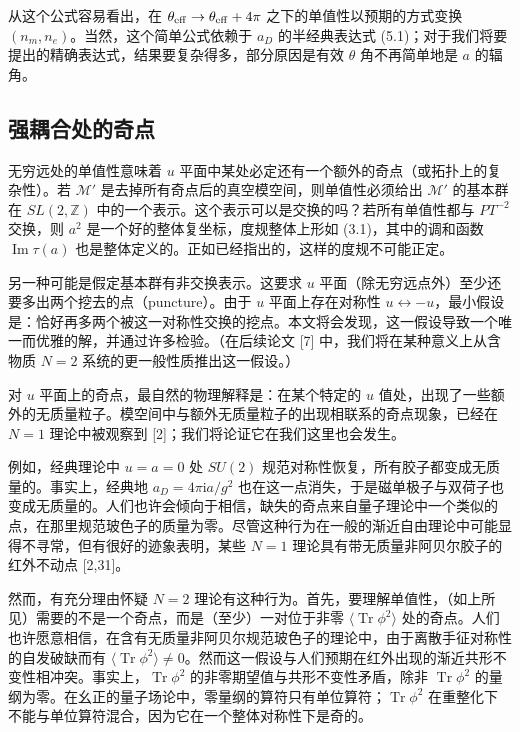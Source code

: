 \documentclass[11pt,a4paper,UTF8,fontset=fandol]{ctexart}
\theoremstyle{plain}
\theoremstyle{definition}
\newcommand{\Z}{\mathbb{Z}}
\newcommand{\ii}{\mathrm{i}}
\newcommand{\Tr}{\operatorname{Tr}}
\renewcommand{\Im}{\operatorname{Im}}
\newcommand{\Nc}{\mathcal{N}}
\newcommand{\Mm}{\mathcal{M}}
\def\Nc{N}%
\begin{document}
从这个公式容易看出，在 $\theta_{\rm eff}\to\theta_{\rm eff}+4\pi$ 之下的单值性以预期的方式变换 $(n_m,n_e)$。当然，这个简单公式依赖于 $a_D$ 的半经典表达式 (5.1)；对于我们将要提出的精确表达式，结果要复杂得多，部分原因是有效 $\theta$ 角不再简单地是 $a$ 的辐角。

\subsection{强耦合处的奇点}

无穷远处的单值性意味着 $u$ 平面中某处必定还有一个额外的奇点（或拓扑上的复杂性）。若 $\Mm'$ 是去掉所有奇点后的真空模空间，则单值性必须给出 $\Mm'$ 的基本群在 $SL(2,\Z)$ 中的一个表示。这个表示可以是交换的吗？若所有单值性都与 $PT^{-2}$ 交换，则 $a^2$ 是一个好的整体复坐标，度规整体上形如 (3.1)，其中的调和函数 $\Im\tau(a)$ 也是整体定义的。正如已经指出的，这样的度规不可能正定。

另一种可能是假定基本群有非交换表示。这要求 $u$ 平面（除无穷远点外）至少还要多出两个挖去的点（puncture）。由于 $u$ 平面上存在对称性 $u\leftrightarrow-u$，最小假设是：恰好再多两个被这一对称性交换的挖点。本文将会发现，这一假设导致一个唯一而优雅的解，并通过许多检验。（在后续论文 [7] 中，我们将在某种意义上从含物质 $\Nc=2$ 系统的更一般性质推出这一假设。）

对 $u$ 平面上的奇点，最自然的物理解释是：在某个特定的 $u$ 值处，出现了一些额外的无质量粒子。模空间中与额外无质量粒子的出现相联系的奇点现象，已经在 $\Nc=1$ 理论中被观察到 [2]；我们将论证它在我们这里也会发生。

例如，经典理论中 $u=a=0$ 处 $SU(2)$ 规范对称性恢复，所有胶子都变成无质量的。事实上，经典地 $a_D=4\pi\ii a/g^2$ 也在这一点消失，于是磁单极子与双荷子也变成无质量的。人们也许会倾向于相信，缺失的奇点来自量子理论中一个类似的点，在那里规范玻色子的质量为零。尽管这种行为在一般的渐近自由理论中可能显得不寻常，但有很好的迹象表明，某些 $\Nc=1$ 理论具有带无质量非阿贝尔胶子的红外不动点 [2,31]。

然而，有充分理由怀疑 $\Nc=2$ 理论有这种行为。首先，要理解单值性，（如上所见）需要的不是一个奇点，而是（至少）一对位于非零 $\langle\Tr\phi^2\rangle$ 处的奇点。人们也许愿意相信，在含有无质量非阿贝尔规范玻色子的理论中，由于离散手征对称性的自发破缺而有 $\langle\Tr\phi^2\rangle\ne0$。然而这一假设与人们预期在红外出现的渐近共形不变性相冲突。事实上，$\Tr\phi^2$ 的非零期望值与共形不变性矛盾，除非 $\Tr\phi^2$ 的量纲为零。在幺正的量子场论中，零量纲的算符只有单位算符；$\Tr\phi^2$ 在重整化下不能与单位算符混合，因为它在一个整体对称性下是奇的。
\end{document}
